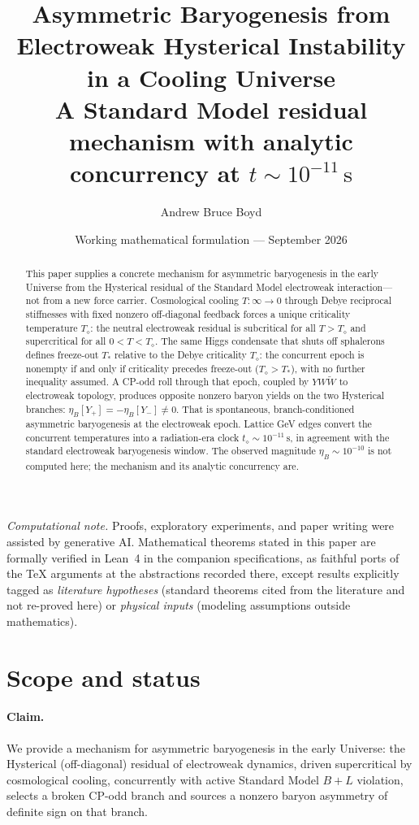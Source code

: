 \documentclass[11pt]{article}
\title{\textbf{Asymmetric Baryogenesis from Electroweak Hysterical Instability in a Cooling Universe}\\[0.35em]
\large A Standard Model residual mechanism with analytic concurrency at $t\sim10^{-11}\,\mathrm{s}$}
\author{Andrew Bruce Boyd}
\date{Working mathematical formulation --- September 2026}
\theoremstyle{definition}
\theoremstyle{remark}
\newcommand{\Td}{T_{\diamond}}
\begin{document}
\maketitle
\noindent\textit{Computational note.}
Proofs, exploratory experiments, and paper writing were assisted by generative AI.
Mathematical theorems stated in this paper are formally verified in Lean~4 in the
companion specifications, as faithful ports of the TeX arguments at the abstractions
recorded there, except results explicitly tagged as \emph{literature hypotheses}
(standard theorems cited from the literature and not re-proved here) or
\emph{physical inputs} (modeling assumptions outside mathematics).

\begin{abstract}
This paper supplies a concrete mechanism for asymmetric baryogenesis in the early
Universe from the Hysterical residual of the Standard Model electroweak
interaction---not from a new force carrier.
Cosmological cooling $T:\infty\to0$ through Debye reciprocal stiffnesses with
fixed nonzero off-diagonal feedback forces a unique criticality temperature
$\Td$: the neutral electroweak residual is subcritical for all $T>\Td$ and
supercritical for all $0<T<\Td$.
The same Higgs condensate that shuts off sphalerons defines freeze-out $T_*$
relative to the Debye criticality $\Td$: the concurrent epoch is nonempty if and
only if criticality precedes freeze-out ($\Td>T_*$), with no further inequality
assumed.
A CP-odd roll through that epoch, coupled by $YW\widetilde W$ to electroweak
topology, produces opposite nonzero baryon yields on the two Hysterical branches:
$\eta_B[Y_+]=-\eta_B[Y_-]\neq0$.
That is spontaneous, branch-conditioned asymmetric baryogenesis at the
electroweak epoch.
Lattice GeV edges convert the concurrent temperatures into a radiation-era clock
$t_\diamond\sim10^{-11}\,\mathrm{s}$, in agreement with the standard electroweak
baryogenesis window.
The observed magnitude $\eta_B\sim10^{-10}$ is not computed here; the mechanism
and its analytic concurrency are.
\end{abstract}
\tableofcontents
\newpage

\section{Scope and status}
\label{sec:scope}
\paragraph{Claim.}
We provide a mechanism for asymmetric baryogenesis in the early Universe:
the Hysterical (off-diagonal) residual of electroweak dynamics, driven supercritical
by cosmological cooling, concurrently with active Standard Model $B{+}L$
violation, selects a broken CP-odd branch and sources a nonzero baryon asymmetry
of definite sign on that branch.
\end{document}
